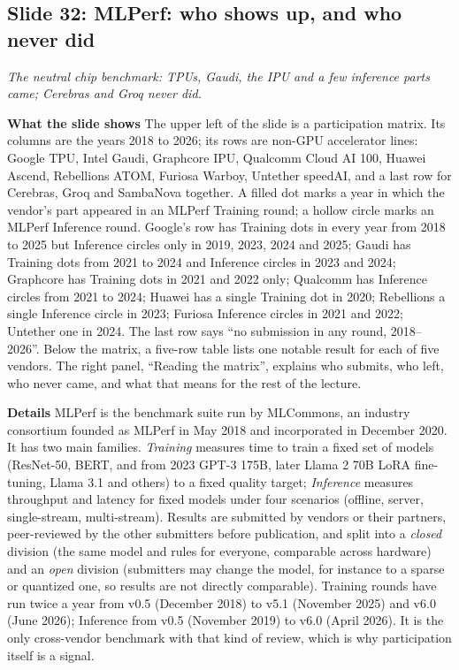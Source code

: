 \documentclass[11pt,letterpaper]{article}
\newcommand{\slide}[3]{%
  \subsection[Slide #1: #2]{Slide #1: #2}%
  {\color{muted}\itshape #3\par}\medskip}
\newcommand{\para}[1]{\medskip\noindent\textbf{#1}\quad}
\begin{document}
\slide{32}{MLPerf: who shows up, and who never did}{The neutral chip benchmark: TPUs, Gaudi, the IPU and a few inference parts came; Cerebras and Groq never did.}

\para{What the slide shows} The upper left of the slide is a participation matrix. Its columns are the years 2018 to 2026; its rows are non-GPU accelerator lines: Google TPU, Intel Gaudi, Graphcore IPU, Qualcomm Cloud AI 100, Huawei Ascend, Rebellions ATOM, Furiosa Warboy, Untether speedAI, and a last row for Cerebras, Groq and SambaNova together. A filled dot marks a year in which the vendor's part appeared in an MLPerf Training round; a hollow circle marks an MLPerf Inference round. Google's row has Training dots in every year from 2018 to 2025 but Inference circles only in 2019, 2023, 2024 and 2025; Gaudi has Training dots from 2021 to 2024 and Inference circles in 2023 and 2024; Graphcore has Training dots in 2021 and 2022 only; Qualcomm has Inference circles from 2021 to 2024; Huawei has a single Training dot in 2020; Rebellions a single Inference circle in 2023; Furiosa Inference circles in 2021 and 2022; Untether one in 2024. The last row says ``no submission in any round, 2018--2026''. Below the matrix, a five-row table lists one notable result for each of five vendors. The right panel, ``Reading the matrix'', explains who submits, who left, who never came, and what that means for the rest of the lecture.

\para{Details} MLPerf is the benchmark suite run by MLCommons, an industry consortium founded as MLPerf in May 2018 and incorporated in December 2020. It has two main families. \emph{Training} measures time to train a fixed set of models (ResNet-50, BERT, and from 2023 GPT-3 175B, later Llama 2 70B LoRA fine-tuning, Llama 3.1 and others) to a fixed quality target; \emph{Inference} measures throughput and latency for fixed models under four scenarios (offline, server, single-stream, multi-stream). Results are submitted by vendors or their partners, peer-reviewed by the other submitters before publication, and split into a \emph{closed} division (the same model and rules for everyone, comparable across hardware) and an \emph{open} division (submitters may change the model, for instance to a sparse or quantized one, so results are not directly comparable). Training rounds have run twice a year from v0.5 (December 2018) to v5.1 (November 2025) and v6.0 (June 2026); Inference from v0.5 (November 2019) to v6.0 (April 2026). It is the only cross-vendor benchmark with that kind of review, which is why participation itself is a signal.
\end{document}
